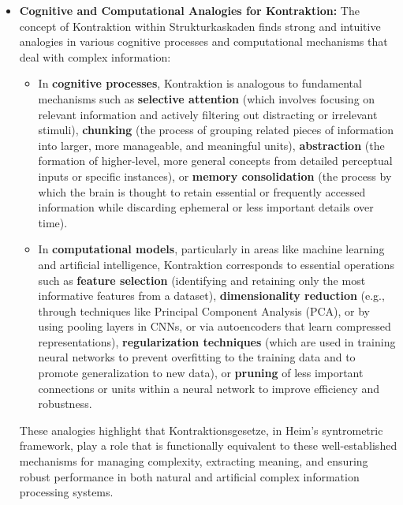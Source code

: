 \documentclass[12pt]{article}
\newcommand{\q}[1]{\enquote{#1}}
\begin{document}
\begin{itemize}
\begin{enumerate}
        \item The operation of some form of an \q{energy minimization} principle or an \q{information compression principle} that has been adapted to apply to these geometric field structures. Such principles would ensure that only the most salient, robust, or informationally efficient patterns are preferentially propagated through the cascade or retained as stable outputs.
    \end{enumerate}
    By enforcing such Kontraktionsgesetze, whether at each stage of the cascade or globally across the entire structure, the Strukturkaskade is effectively guided towards producing stable, meaningful, and non-divergent structural outcomes. This prevents the cascade from devolving into chaotic noise, from generating unmanageable combinatorial explosions of complexity, or from producing physically or cognitively irrelevant structures.

    \item \textbf{Cognitive and Computational Analogies for Kontraktion:}
    The concept of Kontraktion within Strukturkaskaden finds strong and intuitive analogies in various cognitive processes and computational mechanisms that deal with complex information:
    \begin{itemize}
        \item In \textbf{cognitive processes}, Kontraktion is analogous to fundamental mechanisms such as \textbf{selective attention} (which involves focusing on relevant information and actively filtering out distracting or irrelevant stimuli), \textbf{chunking} (the process of grouping related pieces of information into larger, more manageable, and meaningful units), \textbf{abstraction} (the formation of higher-level, more general concepts from detailed perceptual inputs or specific instances), or \textbf{memory consolidation} (the process by which the brain is thought to retain essential or frequently accessed information while discarding ephemeral or less important details over time).
        \item In \textbf{computational models}, particularly in areas like machine learning and artificial intelligence, Kontraktion corresponds to essential operations such as \textbf{feature selection} (identifying and retaining only the most informative features from a dataset), \textbf{dimensionality reduction} (e.g., through techniques like Principal Component Analysis (PCA), or by using pooling layers in CNNs, or via autoencoders that learn compressed representations), \textbf{regularization techniques} (which are used in training neural networks to prevent overfitting to the training data and to promote generalization to new data), or \textbf{pruning} of less important connections or units within a neural network to improve efficiency and robustness.
    \end{itemize}
    These analogies highlight that Kontraktionsgesetze, in Heim's syntrometric framework, play a role that is functionally equivalent to these well-established mechanisms for managing complexity, extracting meaning, and ensuring robust performance in both natural and artificial complex information processing systems.
\end{itemize}
\end{document}
